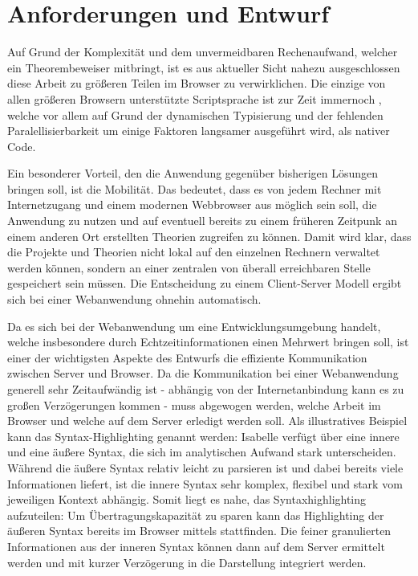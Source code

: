 \chapter{Anforderungen und Entwurf}
\label{sec:draft}

Auf Grund der Komplexität und dem unvermeidbaren Rechenaufwand, welcher ein Theorembeweiser
mitbringt, ist es aus aktueller Sicht nahezu ausgeschlossen diese Arbeit zu größeren Teilen im
Browser zu verwirklichen. Die einzige von allen größeren Browsern unterstützte Scriptsprache ist zur
Zeit immernoch , welche vor allem auf Grund der dynamischen Typisierung und der
fehlenden Paralellisierbarkeit um einige Faktoren langsamer ausgeführt wird, als nativer Code.

Ein besonderer Vorteil, den die Anwendung gegenüber bisherigen Lösungen bringen soll, ist die
Mobilität. Das bedeutet, dass es von jedem Rechner mit Internetzugang und einem modernen Webbrowser
aus möglich sein soll, die Anwendung zu nutzen und auf eventuell bereits zu einem früheren Zeitpunk
an einem anderen Ort erstellten Theorien zugreifen zu können. Damit wird klar, dass die Projekte und
Theorien nicht lokal auf den einzelnen Rechnern verwaltet werden können, sondern an einer zentralen
von überall erreichbaren Stelle gespeichert sein müssen. Die Entscheidung zu einem Client-Server
Modell ergibt sich bei einer Webanwendung ohnehin automatisch.

Da es sich bei der Webanwendung um eine Entwicklungsumgebung handelt, welche insbesondere durch
Echtzeitinformationen einen Mehrwert bringen soll, ist einer der wichtigsten Aspekte des Entwurfs
die effiziente Kommunikation zwischen Server und Browser. Da die Kommunikation bei einer
Webanwendung generell sehr Zeitaufwändig ist - abhängig von der Internetanbindung kann es zu großen
Verzögerungen kommen - muss abgewogen werden, welche Arbeit im Browser und welche auf dem Server
erledigt werden soll. Als illustratives Beispiel kann das Syntax-Highlighting genannt werden:
Isabelle verfügt über eine innere und eine äußere Syntax, die sich im analytischen Aufwand stark
unterscheiden. Während die äußere Syntax relativ leicht zu parsieren ist und dabei bereits viele
Informationen liefert, ist die innere Syntax sehr komplex, flexibel und stark vom jeweiligen Kontext
abhängig. Somit liegt es nahe, das Syntaxhighlighting aufzuteilen: Um Übertragungskapazität zu
sparen kann das Highlighting der äußeren Syntax bereits im Browser mittels  stattfinden. Die
feiner granulierten Informationen aus der inneren Syntax können dann auf dem Server ermittelt werden
und mit kurzer Verzögerung in die Darstellung integriert werden.





